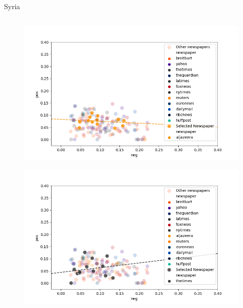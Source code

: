\documentclass[final]{beamer}
\newlength{\twocolwid}
\begin{document}
\begin{frame}[t]
\begin{columns}[t]
\begin{column}{\twocolwid}
\begin{block}{Syria}
    \begin{columns}
        \begin{column}{.45\textwidth}
            \begin{figure}
                \centering
                \begin{minipage}{.5\textwidth}
                \centering
                \includegraphics[width=\linewidth]{poster/syria_5_al.png}
                \label{fig:test1}
                \end{minipage}%
                \begin{minipage}{.5\textwidth}
                \centering
                \includegraphics[width=\linewidth]{poster/syria_5_thetimes.png}
                \label{fig:test2}
                \end{minipage}
            \end{figure}
        \end{column}


\end{columns}
\end{block}
\end{column}
\end{columns}
\end{frame}
\end{document}
